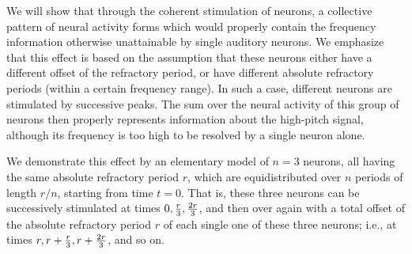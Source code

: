 \documentclass[prl,preprint,amsfonts,showpacs,showkeys]{revtex4}
\begin{document}
We will show that through the coherent stimulation of neurons,
a collective pattern of neural activity forms
which would properly contain the frequency information otherwise unattainable by single
auditory neurons.
We emphasize that this effect is based on the assumption that these neurons either have a different offset of the refractory period,
or have different absolute refractory periods (within a certain frequency range).
In such a case, different neurons are stimulated by successive peaks.
The sum over the neural activity of this group of neurons then properly represents
information about the high-pitch signal, although its frequency is too
high to be resolved by a single neuron alone.


We demonstrate this effect by an elementary model of $n=3$ neurons, all having the same
absolute refractory period $r$, which are equidistributed over $n$ periods of
length $r/n$, starting from time $t=0$.
That is, these three neurons can be successively stimulated at times
$
0,
{r\over 3},
{2r\over 3}$,
and then over again with a total offset of the
absolute refractory period $r$ of each single one of these three neurons; i.e., at times
$
r,
r+{r\over 3},
r+{2r\over 3}$, and so on.
\end{document}
